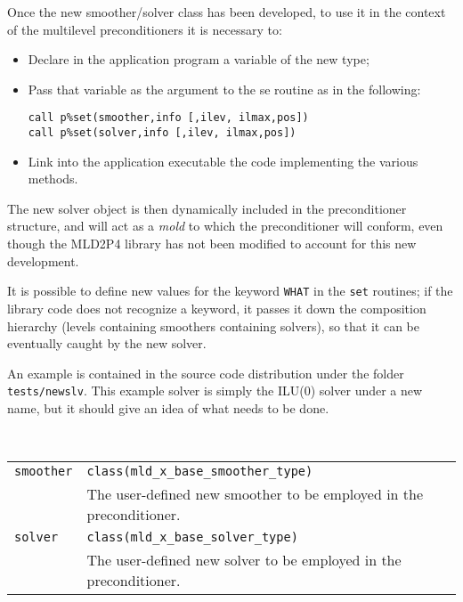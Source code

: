 Once the new smoother/solver class has been developed, to use it in
the context of the multilevel preconditioners it is necessary to:
\begin{itemize}
\item Declare in the application program a variable of the new type;
\item  Pass that variable as the argument to the se routine as in the
  following:
\begin{center}
\verb|call p%set(smoother,info [,ilev, ilmax,pos])|\\
\verb|call p%set(solver,info [,ilev, ilmax,pos])|
\end{center}
\item Link into the application executable the code implementing the
  various methods.
\end{itemize}
The new solver object is then dynamically included in the
preconditioner structure, and  will act as a \emph{mold} to which the 
preconditioner will conform, even though the MLD2P4 library has not
been modified to account for this new development. 

It is possible to define new values for the keyword \verb|WHAT| in the
\verb|set| routines; if the library code does not recognize a keyword,
it passes it down the composition hierarchy (levels containing
smoothers containing solvers), so that it can be eventually caught by
the new solver. 

An example is contained in the source code distribution under the
folder \verb|tests/newslv|. This example solver is simply the ILU(0)
solver under a new name, but it should give an idea of what needs to
be done. 

\ \\

\begin{tabular}{p{1.2cm}p{12cm}}
\verb|smoother| & \verb|class(mld_x_base_smoother_type)| \\
              & The user-defined new smoother to be employed in the
                preconditioner.\\
\verb|solver| & \verb|class(mld_x_base_solver_type)| \\
              & The user-defined new solver to be employed in the
                preconditioner.
\end{tabular}

